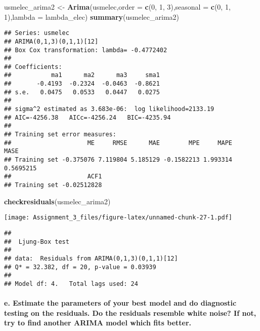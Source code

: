 \documentclass[]{article}
\newenvironment{Shaded}{\begin{snugshade}}{\end{snugshade}}
\newcommand{\KeywordTok}[1]{\textcolor[rgb]{0.13,0.29,0.53}{\textbf{#1}}}
\newcommand{\DataTypeTok}[1]{\textcolor[rgb]{0.13,0.29,0.53}{#1}}
\newcommand{\DecValTok}[1]{\textcolor[rgb]{0.00,0.00,0.81}{#1}}
\newcommand{\StringTok}[1]{\textcolor[rgb]{0.31,0.60,0.02}{#1}}
\newcommand{\NormalTok}[1]{#1}
\let\oldparagraph\paragraph
\renewcommand{\paragraph}[1]{\oldparagraph{#1}\mbox{}}
\begin{document}
\begin{Shaded}
\begin{Highlighting}[]
\NormalTok{usmelec_arima2 <-}\StringTok{ }\KeywordTok{Arima}\NormalTok{(usmelec,}\DataTypeTok{order =} \KeywordTok{c}\NormalTok{(}\DecValTok{0}\NormalTok{, }\DecValTok{1}\NormalTok{, }\DecValTok{3}\NormalTok{),}\DataTypeTok{seasonal =} \KeywordTok{c}\NormalTok{(}\DecValTok{0}\NormalTok{, }\DecValTok{1}\NormalTok{, }\DecValTok{1}\NormalTok{),}\DataTypeTok{lambda =}\NormalTok{ lambda_elec)}
\KeywordTok{summary}\NormalTok{(usmelec_arima2)}
\end{Highlighting}
\end{Shaded}

\begin{verbatim}
## Series: usmelec 
## ARIMA(0,1,3)(0,1,1)[12] 
## Box Cox transformation: lambda= -0.4772402 
## 
## Coefficients:
##           ma1      ma2      ma3     sma1
##       -0.4193  -0.2324  -0.0463  -0.8621
## s.e.   0.0475   0.0533   0.0447   0.0275
## 
## sigma^2 estimated as 3.683e-06:  log likelihood=2133.19
## AIC=-4256.38   AICc=-4256.24   BIC=-4235.94
## 
## Training set error measures:
##                     ME     RMSE      MAE        MPE     MAPE      MASE
## Training set -0.375076 7.119804 5.185129 -0.1582213 1.993314 0.5695215
##                     ACF1
## Training set -0.02512828
\end{verbatim}

\begin{Shaded}
\begin{Highlighting}[]
\KeywordTok{checkresiduals}\NormalTok{(usmelec_arima2)}
\end{Highlighting}
\end{Shaded}

\texttt{[image: Assignment\_3\_files/figure-latex/unnamed-chunk-27-1.pdf]}

\begin{verbatim}
## 
##  Ljung-Box test
## 
## data:  Residuals from ARIMA(0,1,3)(0,1,1)[12]
## Q* = 32.382, df = 20, p-value = 0.03939
## 
## Model df: 4.   Total lags used: 24
\end{verbatim}

\paragraph{e. Estimate the parameters of your best model and do
diagnostic testing on the residuals. Do the residuals resemble white
noise? If not, try to find another ARIMA model which fits
better.}\label{e.-estimate-the-parameters-of-your-best-model-and-do-diagnostic-testing-on-the-residuals.-do-the-residuals-resemble-white-noise-if-not-try-to-find-another-arima-model-which-fits-better.}
\end{document}
